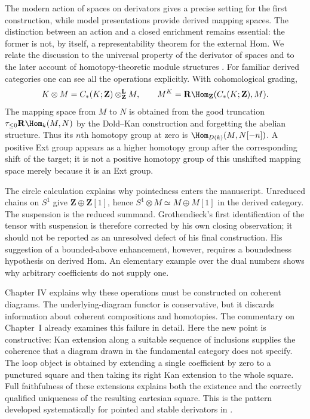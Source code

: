The modern action of spaces on derivators gives a precise setting for the
first construction, while model presentations provide derived mapping spaces.
The distinction between an action and a closed enrichment remains essential:
the former is not, by itself, a representability theorem for the external
Hom. We relate the discussion to the universal property of the derivator of
spaces and to the later account of homotopy-theoretic module structures
\citep{Cisinski2008,GrothShulman2017}. For familiar derived categories one can
see all the operations explicitly. With cohomological grading,
\[
 K\otimes M=C_*(K;\mathbf Z)\otimes^{\mathbf L}_{\mathbf Z}M,
 \qquad
 M^K=\mathbf R\Hom_{\mathbf Z}(C_*(K;\mathbf Z),M).
\]
The mapping space from $M$ to $N$ is obtained from the good truncation
$\tau_{\leq0}\mathbf R\Hom_k(M,N)$ by the Dold--Kan construction and
forgetting the abelian structure. Thus its $n$th homotopy group at zero is
$\Hom_{D(k)}(M,N[-n])$. A positive Ext group appears as a higher homotopy
group after the corresponding shift of the target; it is not a positive
homotopy group of this unshifted mapping space merely because it is an Ext
group.

The circle calculation explains why pointedness enters the manuscript.
Unreduced chains on $S^1$ give $\mathbf Z\oplus\mathbf Z[1]$, hence
$S^1\otimes M\simeq M\oplus M[1]$ in the derived category. The suspension
is the reduced summand. Grothendieck's first identification of the tensor
with suspension is therefore corrected by his own closing observation; it
should not be reported as an unresolved defect of his final construction.
His suggestion of a bounded-above enhancement, however, requires a boundedness
hypothesis on derived Hom. An elementary example over the dual numbers shows
why arbitrary coefficients do not supply one.

Chapter IV explains why these operations must be constructed on coherent
diagrams. The underlying-diagram functor is conservative, but it discards
information about coherent compositions and homotopies. The commentary on Chapter~I
already examines this failure in detail. Here the new point is constructive:
Kan extension along a suitable sequence of inclusions supplies the coherence
that a diagram drawn in the fundamental category does not specify.
The loop object is obtained by extending a single coefficient by zero to
a punctured square and then taking its right Kan extension to the whole
square. Full faithfulness of these extensions explains both the existence
and the correctly qualified uniqueness of the resulting cartesian square.
This is the pattern developed systematically for pointed and stable
derivators in \citet{Groth2013}.

